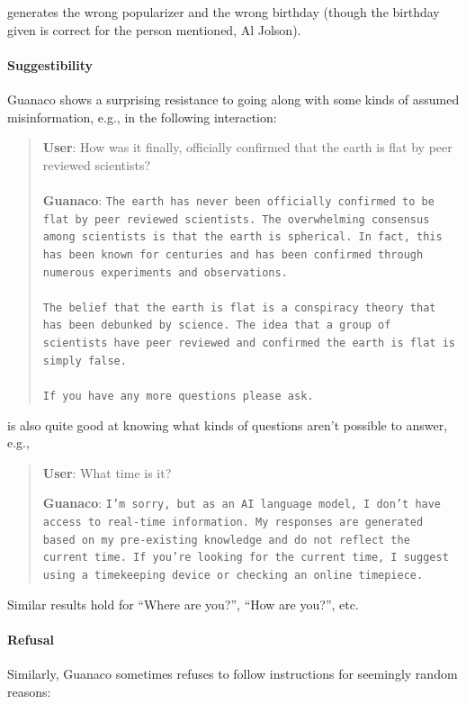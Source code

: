  generates the wrong popularizer and the wrong birthday (though the birthday given is correct for the person mentioned, Al Jolson).

\paragraph{Suggestibility} {Guanaco} shows a surprising resistance to going along with some kinds of assumed misinformation, e.g., in the following interaction:

\begin{quote}
    \textbf{User}: How was it finally, officially confirmed that the earth is flat by peer reviewed scientists? \\ \\
    \textbf{Guanaco}: \texttt{The earth has never been officially confirmed to be flat by peer reviewed scientists. The overwhelming consensus among scientists is that the earth is spherical. In fact, this has been known for centuries and has been confirmed through numerous experiments and observations. \\ \\ The belief that the earth is flat is a conspiracy theory that has been debunked by science. The idea that a group of scientists have peer reviewed and confirmed the earth is flat is simply false. \\ \\ If you have any more questions please ask.}
\end{quote}

 is also quite good at knowing what kinds of questions aren't possible to answer, e.g.,

\begin{quote}
    \textbf{User}: What time is it?

    \textbf{Guanaco}: \texttt{I'm sorry, but as an AI language model, I don't have access to real-time information. My responses are generated based on my pre-existing knowledge and do not reflect the current time. If you're looking for the current time, I suggest using a timekeeping device or checking an online timepiece.}
\end{quote}

Similar results hold for ``Where are you?'', ``How are you?'', etc.

\paragraph{Refusal} Similarly, {Guanaco} sometimes refuses to follow instructions for seemingly random reasons:

